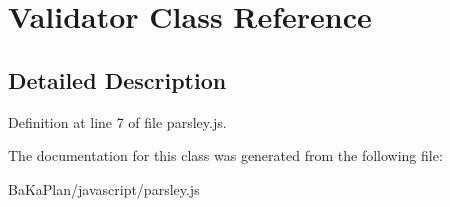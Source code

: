 \hypertarget{classValidator}{\section{Validator Class Reference}
\label{classValidator}
}


\subsection{Detailed Description}


Definition at line 7 of file parsley.\-js.



The documentation for this class was generated from the following file\-:\begin{DoxyCompactItemize}
\item 
Ba\-Ka\-Plan/javascript/parsley.\-js\end{DoxyCompactItemize}

